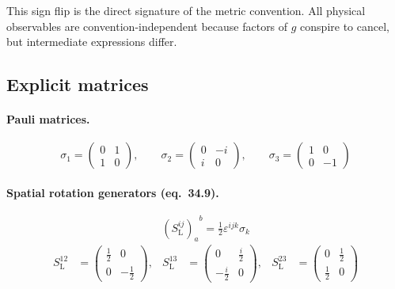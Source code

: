 \medskip

\noindent This sign flip is the direct signature of the metric convention.
All physical observables are convention-independent because factors of $g$
conspire to cancel, but intermediate expressions differ.

\subsection{Explicit matrices}

\paragraph{Pauli matrices.}
\begin{equation}
  \sigma_1 = \begin{pmatrix}0 & 1 \\ 1 & 0\end{pmatrix},\qquad
  \sigma_2 = \begin{pmatrix}0 & -i \\ i & 0\end{pmatrix},\qquad
  \sigma_3 = \begin{pmatrix}1 & 0 \\ 0 & -1\end{pmatrix}
  \tag{34.8}
\end{equation}

\paragraph{Spatial rotation generators (eq.~34.9).}
\begin{equation}
  {(S^{ij}_{\mathrm{L}})_a}^b = \tfrac{1}{2}\varepsilon^{ijk}\sigma_k
  \tag{34.9}
\end{equation}
\begin{align*}
  S^{12}_{\mathrm{L}} &= \begin{pmatrix}\tfrac{1}{2} & 0 \\ 0 & -\tfrac{1}{2}\end{pmatrix},&
  S^{13}_{\mathrm{L}} &= \begin{pmatrix}0 & \tfrac{i}{2} \\ -\tfrac{i}{2} & 0\end{pmatrix},&
  S^{23}_{\mathrm{L}} &= \begin{pmatrix}0 & \tfrac{1}{2} \\ \tfrac{1}{2} & 0\end{pmatrix}
\end{align*}

